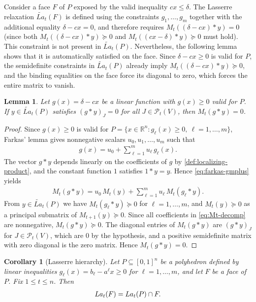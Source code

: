 \documentclass{article}
\newtheorem{corollary}{Corollary}
\newtheorem{lemma}{Lemma}
\newcommand{\R}{\mathbb{R}}
\renewcommand{\P}{\mathcal{P}}
\begin{document}
Consider a face $F$ of $P$ exposed by the valid inequality $cx \leq \delta$. The Lasserre relaxation $\widetilde{La}_t(F)$ is defined using the constraints $g_1,\ldots,g_m$ together with the additional equality $\delta - cx = 0$, and therefore requires $M_t((\delta - cx) * y) = 0$ (since both $M_t((\delta - cx)*y) \succeq 0$ and $M_t((cx - \delta)*y) \succeq 0$ must hold). This constraint is not present in $\widetilde{La}_t(P)$. Nevertheless, the following lemma shows that it is automatically satisfied on the face. Since $\delta - cx \geq 0$ is valid for $P$, the semidefinite constraints in $\widetilde{La}_t(P)$ already imply $M_t((\delta - cx)*y) \succeq 0$, and the binding equalities on the face force its diagonal to zero, which forces the entire matrix to vanish.

\begin{lemma} \label{lemma:lasserre-face-redundancy}
    Let $g(x) = \delta - cx$ be a linear function with $g(x) \geq 0$ valid for $P$. If $y \in \widetilde{La}_t(P)$ satisfies $(g * y)_J = 0$ for all $J \in \P_t(V)$, then $M_t(g * y) = 0$.
\end{lemma}

\begin{proof}
    Since $g(x) \geq 0$ is valid for $P = \{x \in \R^n : g_\ell(x) \geq 0, \ \ell = 1,\ldots,m\}$, Farkas' lemma gives nonnegative scalars $u_0, u_1, \ldots, u_m$ such that
    \begin{align}
        g(x) = u_0 + \sum_{\ell=1}^m u_\ell\, g_\ell(x). \label{eq:farkas-gmplus}
    \end{align}
    The vector $g * y$ depends linearly on the coefficients of $g$ by \eqref{def:localizing-product}, and the constant function $1$ satisfies $1 * y = y$. Hence \eqref{eq:farkas-gmplus} yields
    \begin{align}
        M_t(g * y) = u_0\, M_t(y) + \sum_{\ell=1}^m u_\ell\, M_t(g_\ell * y). \label{eq:Mt-decomp}
    \end{align}
    From $y \in \widetilde{La}_t(P)$ we have $M_t(g_\ell * y) \succeq 0$ for $\ell = 1,\ldots,m$, and $M_t(y) \succeq 0$ as a principal submatrix of $M_{t+1}(y) \succeq 0$. Since all coefficients in \eqref{eq:Mt-decomp} are nonnegative, $M_t(g * y) \succeq 0$. The diagonal entries of $M_t(g * y)$ are $(g*y)_J$ for $J \in \P_t(V)$, which are $0$ by the hypothesis, and a positive semidefinite matrix with zero diagonal is the zero matrix. Hence $M_t(g * y) = 0$.
\end{proof}

\begin{corollary}[Lasserre hierarchy] \label{cor:lasserre-hered}
    Let $P \subseteq [0,1]^n$ be a polyhedron defined by linear inequalities $g_\ell(x) = b_\ell - {a^\ell} x \geq 0$ for $\ell = 1,\ldots,m$, and let $F$ be a face of $P$. Fix $1 \leq t \leq n$. Then
    \begin{align}
        La_t(F) = La_t(P) \cap F. \notag
    \end{align}
\end{corollary}
\end{document}
